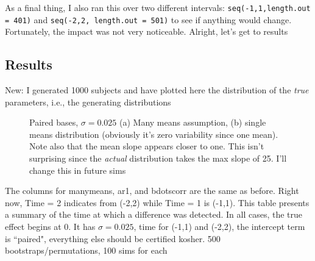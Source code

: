 \documentclass{article}
\newcommand{\xt}{\texttt}
\begin{document}
As a final thing, I also ran this over two different intervals: \xt{seq(-1,1,length.out = 401)} and \xt{seq(-2,2, length.out = 501)} to see if anything would change. Fortunately, the impact was not very noticeable. Alright, let's get to results

\subsection{Results}

New: I generated 1000 subjects and have plotted here the distribution of the \textit{true} parameters, i.e., the generating distributions

\begin{figure}[H]
    \centering
    \caption{Paired bases, $\sigma = 0.025$ (a) Many means assumption, (b) single means distribution (obviously it's zero variability since one mean). Note also that the mean slope appears closer to one. This isn't surprising since the \textit{actual} distribution takes the max slope of 25. I'll change this in future sims }
\label{fig:pair_high_sig_dist_plots}
\end{figure}

The columns for manymeans, ar1, and bdotscorr are the same as before. Right now, Time = 2 indicates from (-2,2) while Time = 1 is (-1,1). This table presents a summary of the time at which a difference was detected. In all cases, the true effect begins at 0. It has $\sigma = 0.025$, time for (-1,1) and (-2,2), the intercept term is ``paired", everything else should be certified kosher. 500 bootstraps/permutations, 100 sims for each
\end{document}
